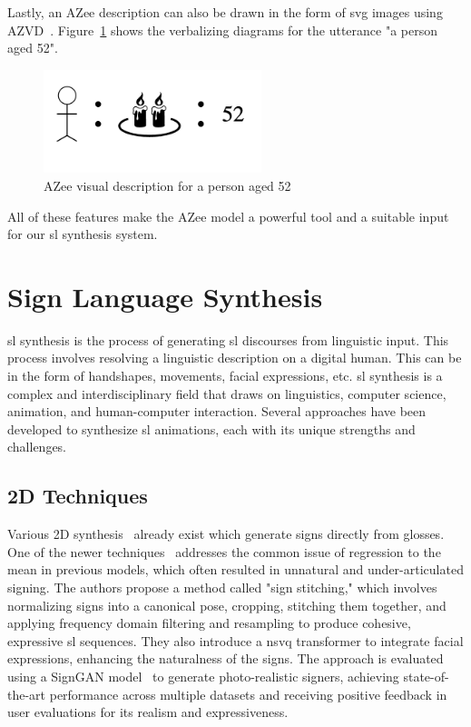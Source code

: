 \documentclass[../../main.tex]{subfiles}
\begin{document}
Lastly, an AZee description can also be drawn in the form of \gls{svg} images using AZVD~\cite{filhol2024software}. Figure~\ref{fig:azvd} shows the verbalizing diagrams for the \gls{utterance} "a person aged 52".

\begin{figure}
  \centering \includegraphics[width = 2.5in]{chapters/background_work/images/azvd.png}
  \caption{AZee visual description for a person aged 52}
  \label{fig:azvd}
\end{figure}

All of these features make the AZee model a powerful tool and a suitable input for our \gls{sl} synthesis system.

\section{Sign Language Synthesis}
\label{ch:background_work:sign_language_synthesis}

\gls{sl} synthesis is the process of generating \gls{sl} discourses from linguistic input. This process involves resolving a linguistic description on a digital human. This can be in the form of handshapes, movements, facial expressions, etc. \gls{sl} synthesis is a complex and interdisciplinary field that draws on linguistics, computer science, animation, and human-computer interaction. Several approaches have been developed to synthesize \gls{sl} animations, each with its unique strengths and challenges.

\subsection{2D Techniques}
\label{ch:background_work:sign_language_synthesis:2d_techniques}

Various 2D synthesis~\cite{jiang2024signclipconnectingtextsign, moryossef2024signmtrealtimemultilingualsign} already exist which generate signs directly from \gls{glosses}. One of the newer techniques~\cite{walsh2024sign} addresses the common issue of regression to the mean in previous models, which often resulted in unnatural and under-articulated signing. The authors propose a method called "sign stitching," which involves normalizing signs into a canonical pose, cropping, stitching them together, and applying frequency domain filtering and resampling to produce cohesive, expressive \gls{sl} sequences. They also introduce a \gls{nsvq} transformer to integrate facial expressions, enhancing the naturalness of the signs. The approach is evaluated using a SignGAN model~\cite{saunders2020everybodysignnowtranslating} to generate photo-realistic signers, achieving state-of-the-art performance across multiple datasets and receiving positive feedback in user evaluations for its realism and expressiveness.
\end{document}
